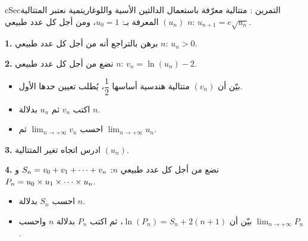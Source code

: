\documentclass[12pt,a4paper]{article}
\newenvironment{BOX}[2]{\begin{otherlanguage}{english}\begin{arbox}{#1}{#2}}{\end{arbox}\end{otherlanguage}}
\newcounter{exo}
\newenvironment{tamrin}[1]{\stepcounter{exo}\begin{BOX}{cSec}{التمرين \theexo: #1}}{\end{BOX}}
\renewcommand{\cdots}{\mathinner{\cdotp\cdotp\cdotp}}
\newcommand{\limn}{\displaystyle\lim_{n\to+\infty}}
\newenvironment{sq}{\begin{itemize}[leftmargin=2.4em,itemsep=3pt]}{\end{itemize}}
\newcommand{\qa}{\item[(أ)]}\newcommand{\qb}{\item[(ب)]}\newcommand{\qc}{\item[(جـ)]}\newcommand{\qd}{\item[(د)]}\newcommand{\qe}{\item[(هـ)]}
\newcommand{\QQ}[1]{\par\smallskip\textbf{#1.} }
\begin{document}
\begin{tamrin}{متتالية معرّفة باستعمال الدالتين الأسية واللوغاريتمية}
نعتبر المتتالية $(u_n)$ المعرفة بـ: $u_0=1$، ومن أجل كل عدد طبيعي $n$: $u_{n+1}=e\sqrt{u_n}$.
\QQ{1} برهن بالتراجع أنه من أجل كل عدد طبيعي $n$: $u_n>0$.
\QQ{2} نضع من أجل كل عدد طبيعي $n$: $v_n=\ln\left(u_n\right)-2$.
\begin{sq}
\qa بيّن أن $(v_n)$ متتالية هندسية أساسها $\dfrac12$، يُطلب تعيين حدها الأول.
\qb اكتب $v_n$ ثم $u_n$ بدلالة $n$.
\qc احسب $\limn v_n$ ثم $\limn u_n$.
\end{sq}
\QQ{3} ادرس اتجاه تغير المتتالية $(u_n)$.
\QQ{4} نضع من أجل كل عدد طبيعي $n$: $S_n=v_0+v_1+\cdots+v_n$ و $P_n=u_0\times u_1\times\cdots\times u_n$.
\begin{sq}
\qa احسب $S_n$ بدلالة $n$.
\qb بيّن أن $\ln\left(P_n\right)=S_n+2(n+1)$، ثم اكتب $P_n$ بدلالة $n$ واحسب $\limn P_n$.
\end{sq}
\end{tamrin}
\end{document}
